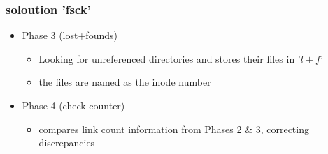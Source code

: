 \documentclass[handout]{beamer}
\begin{document}
        \begin{frame}
			\frametitle{soloution 'fsck'}
            \begin{itemize}
                \item<3-> Phase 3 (lost+founds)
                \begin{itemize}
                    \item<3-> Looking for unreferenced directories and stores their files in '$l+f$'
                    \item<3-> the files are named as the inode number
                \end{itemize}
                \item<1-> Phase 4 (check counter)
                \begin{itemize}
                    \item<1-> compares link count information from Phases 2 \& 3, correcting discrepancies
                \end{itemize}
            \end{itemize}
		\end{frame}
\end{document}
